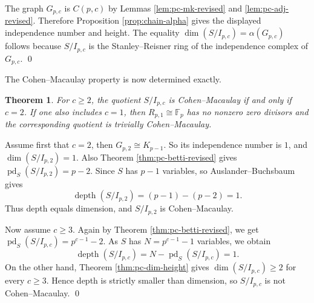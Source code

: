 \documentclass[12pt]{article}
\newtheorem{theorem}{Theorem}[section]
\theoremstyle{definition}
\renewenvironment{proof}{{\bf \noindent Proof.}}{\qed}
\begin{document}
\begin{proof}
	The graph $G_{p,c}$ is $C(p,c)$ by Lemmas \ref{lem:pc-mk-revised} and \ref{lem:pc-adj-revised}.  Therefore Proposition \ref{prop:chain-alpha} gives the displayed independence number and height.  The equality $\dim(S/I_{p,c})=\alpha(G_{p,c})$ follows because $S/I_{p,c}$ is the Stanley--Reisner ring of the independence complex of $G_{p,c}$.
\end{proof}

\medskip

The Cohen--Macaulay property is now determined exactly.

\medskip

\begin{theorem}\label{thm:pc-CM-revised}
	For $c\geq 2$, the quotient $S/I_{p,c}$ is Cohen--Macaulay if and only if $c=2$.  If one also includes $c=1$, then $R_{p,1}\cong\mathbb F_p$ has no nonzero zero divisors and the corresponding quotient is trivially Cohen--Macaulay.
\end{theorem}

\begin{proof}
	Assume first that $c=2$, then $G_{p,2}\cong K_{p-1}$. So its independence number is $1$, and $\dim(S/I_{p,2})=1$.  Also Theorem \ref{thm:pc-betti-revised} gives
	$ \operatorname{pd}_S(S/I_{p,2})=p-2. $
	Since $S$ has $p-1$ variables, so Auslander--Buchsbaum gives
	$$
	\operatorname{depth}(S/I_{p,2})=(p-1)-(p-2)=1.
	$$
	Thus depth equals dimension, and $S/I_{p,2}$ is Cohen--Macaulay.
	
	 Now assume $c\geq 3$.  Again by Theorem \ref{thm:pc-betti-revised}, we get
	$
	\operatorname{pd}_S(S/I_{p,c})=p^{c-1}-2.
	$
	As $S$ has $N=p^{c-1}-1$ variables, we obtain
	$$
	\operatorname{depth}(S/I_{p,c})=N-\operatorname{pd}_S(S/I_{p,c})=1.
	$$
	On the other hand, Theorem \ref{thm:pc-dim-height} gives $\dim(S/I_{p,c})\geq 2$ for every $c\geq 3$.  Hence depth is strictly smaller than dimension, so $S/I_{p,c}$ is not Cohen--Macaulay.
\end{proof}

\medskip
\end{document}
